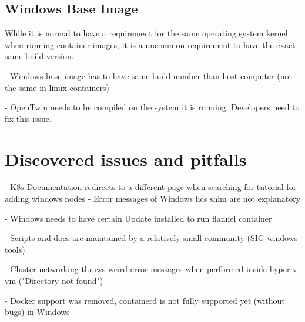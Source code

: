 \subsection{Windows Base Image}
While it is normal to have a requirement for the same operating system kernel when running container images, it is a uncommon requirement to have the exact same build version.

- Windows base image has to have same build number than host computer (not the same in linux containers)

- OpenTwin needs to be compiled on the system it is running. Developers need to fix this issue.

\section{Discovered issues and pitfalls}



- K8s Documentation redirects to a different page when searching for tutorial for adding windows nodes
- Error messages of Windows hcs shim are not explanatory

- Windows needs to have certain Update installed to run flannel container


- Scripts and docs are maintained by a relatively small community (SIG windows tools)

- Cluster networking throws weird error messages when performed inside hyper-v vm ("Directory not found")

- Docker support was removed, containerd is not fully supported yet (without bugs) in Windows
